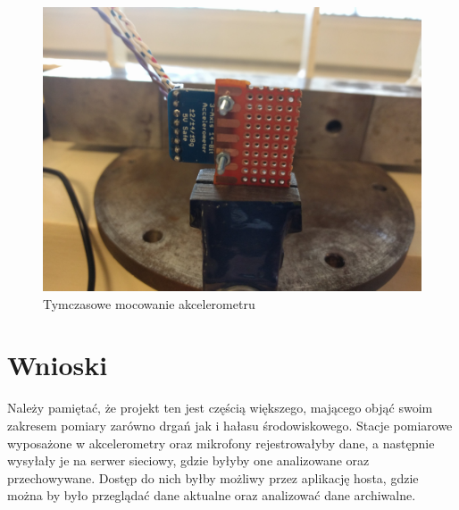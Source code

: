 \documentclass[a4paper,12pt]{mwart}
\begin{document}
\begin{figure}[H]
  \centering
  \includegraphics[width=\textwidth]{bitgraphics/pomiar_3.jpg}
  \caption{Tymczasowe mocowanie akcelerometru}
  \label{fig:imadlo}
\end{figure}


\section{Wnioski}


Należy pamiętać, że projekt ten jest częścią większego, mającego objąć swoim
zakresem pomiary zarówno drgań jak i hałasu środowiskowego. Stacje pomiarowe
wyposażone w akcelerometry oraz mikrofony rejestrowałyby dane, a następnie
wysyłały je na serwer sieciowy, gdzie byłyby one analizowane oraz przechowywane.
Dostęp do nich byłby możliwy przez aplikację hosta, gdzie można by było
przeglądać dane aktualne oraz analizować dane archiwalne.

\printbibliography[title=Bibliografia]
\end{document}
